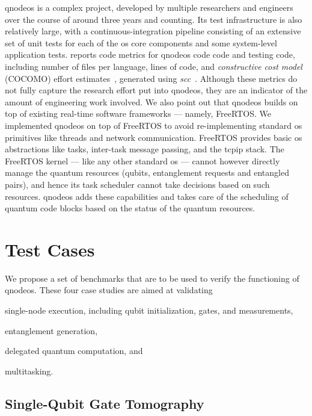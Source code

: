 \acrshort{qnodeos} is a complex project, developed by multiple researchers and engineers over the
course of around three years and counting. Its test infrastructure is also relatively large, with a
continuous-integration pipeline consisting of an extensive set of unit tests for each of the
\acrshort{os} core components and some system-level application tests. 
reports code metrics for \acrshort{qnodeos} code code and testing code, including number of files
per language, lines of code, and \emph{constructive cost model} (COCOMO) effort
estimates~\cite{boehm_2009}, generated using \textit{scc}~\cite{scc}. Although these metrics do not
fully capture the research effort put into \acrshort{qnodeos}, they are an indicator of the amount
of engineering work involved. We also point out that \acrshort{qnodeos} builds on top of existing
real-time software frameworks --- namely, FreeRTOS. We implemented \acrshort{qnodeos} on top of
FreeRTOS to avoid re-implementing standard \acrshort{os} primitives like threads and network
communication. FreeRTOS provides basic \acrshort{os} abstractions like tasks, inter-task message
passing, and the \acrshort{tcpip} stack. The FreeRTOS kernel --- like any other standard
\acrshort{os} --- cannot however directly manage the quantum resources (qubits, entanglement
requests and entangled pairs), and hence its task scheduler cannot take decisions based on such
resources. \acrshort{qnodeos} adds these capabilities and takes care of the scheduling of quantum
code blocks based on the status of the quantum resources.

\section{Test Cases}
\label{sec:qnodeos:evaluation}

We propose a set of benchmarks that are to be used to verify the functioning of \acrshort{qnodeos}.
These four case studies are aimed at validating
\begin{inlinelist}
    \item single-node execution, including qubit initialization, gates, and measurements,
    \item entanglement generation,
    \item delegated quantum computation, and
    \item multitasking.
\end{inlinelist}

\subsection{Single-Qubit Gate Tomography}


